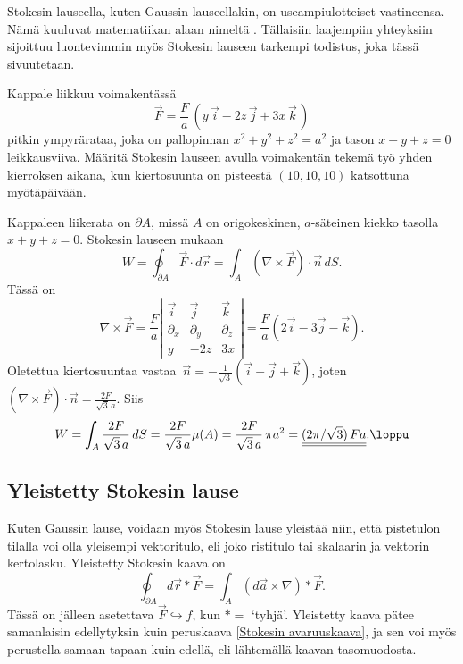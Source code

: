 Stokesin lauseella, kuten Gaussin lauseellakin, on useampiulotteiset vastineensa. Nämä kuuluvat
matematiikan alaan nimeltä . Tällaisiin laajempiin yhteyksiin
sijoittuu luontevimmin myös Stokesin lauseen tarkempi todistus, joka tässä sivuutetaan.
\begin{Exa}
Kappale liikkuu voimakentässä
\[
\vec F=\frac{F}{a}\,(y\,\vec i-2z\,\vec j+3x\,\vec k\,)
\]
pitkin ympyrärataa, joka on pallopinnan $x^2+y^2+z^2=a^2$ ja tason $x+y+z=0$ leikkausviiva. 
Määritä Stokesin lauseen avulla voimakentän tekemä työ yhden kierroksen aikana, kun
kiertosuunta on pisteestä $(10,10,10)$ katsottuna myötäpäivään.
\end{Exa}
\ratk Kappaleen liikerata on $\partial A$, missä $A$ on origokeskinen, $a$-säteinen kiekko
tasolla $x+y+z=0$. Stokesin lauseen mukaan
\[
W=\oint_{\partial A} \vec F\cdot d\vec r=\int_A (\nabla\times\vec F)\cdot\vec n\,dS.
\]
Tässä on
\[
\nabla\times\vec F
=\frac{F}{a} \left|\begin{array}{ccc} 
 \vec i & \vec j & \vec k \\ \partial_x & \partial_y & \partial_z \\ y & -2z & 3x
 \end{array}\right|
=\frac{F}{a}(2\vec i-3\vec j -\vec k).
\]
Oletettua kiertosuuntaa vastaa $\,\vec n=-\frac{1}{\sqrt{3}}(\vec i+\vec j+\vec k)$, joten
$(\nabla\times\vec F)\cdot\vec n = \frac{2F}{\sqrt{3}\,a}$. Siis
\[
W = \int_A \frac{2F}{\sqrt{3}\,a}\,dS = \frac{2F}{\sqrt{3}\,a}\mu(A)
  = \frac{2F}{\sqrt{3}\,a}\,\pi a^2 = \underline{\underline{(2\pi/\sqrt{3})\,Fa}}. \loppu
\]

\subsection{Yleistetty Stokesin lause}

Kuten Gaussin lause, voidaan myös Stokesin lause yleistää niin, että pistetulon tilalla voi olla
yleisempi vektoritulo, eli joko ristitulo tai skalaarin ja vektorin kertolasku. Yleistetty
Stokesin kaava on
\[
\boxed{\quad \oint_{\partial A} d\vec r\ast\vec F=\int_A (d\vec a\times\nabla)\ast\vec F. \quad}
\]
Tässä on jälleen asetettava $\vec F\hookrightarrow f$, kun $\ast=$ `tyhjä'. Yleistetty kaava
pätee samanlaisin edellytyksin kuin peruskaava \eqref{Stokesin avaruuskaava}, ja sen voi myös 
perustella samaan tapaan kuin edellä, eli lähtemällä kaavan tasomuodosta.


